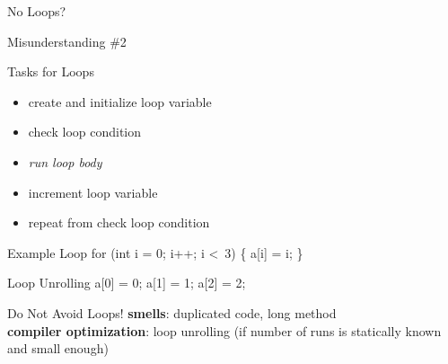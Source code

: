 \begin{frame}{No Loops?}
	\begin{fancycolumns}
		\begin{example}{Misunderstanding \#2}
		\end{example}
		\begin{definition}{{Tasks for Loops}}
			\begin{itemize}
				\item create and initialize loop variable
				\item check loop condition
				\item \emph{run loop body}
				\item increment loop variable
				\item repeat from check loop condition
			\end{itemize}
		\end{definition}
		\nextcolumn
		\begin{example}{Example Loop}
			for (int i = 0; i++; i \textless\  3) \{ a[i] = i; \}
		\end{example}
		\begin{example}{Loop Unrolling}
			a[0] = 0; a[1] = 1; a[2] = 2;
		\end{example}
		\begin{note}{Do Not Avoid Loops!}
			\textbf{smells}: duplicated code, long method\\\textbf{compiler optimization}: loop unrolling (if number of runs is statically known and small enough)
		\end{note}
	\end{fancycolumns}
\end{frame}

